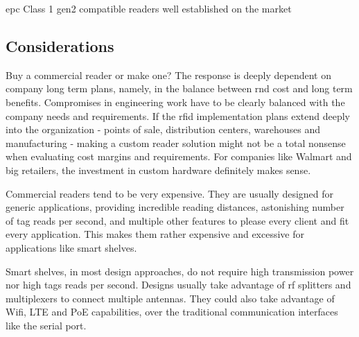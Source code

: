 \begin{table}
    \centering
    \caption{\ac{epc} Class 1 \ac{gen2} compatible readers well established on the market}
    \label{tab:readercommercialsolutions}
\end{table}

\subsection{Considerations}

Buy a commercial reader or make one?
The response is deeply dependent on company long term plans, namely, in the balance between \ac{rnd} cost and long term benefits. Compromises in engineering work have to be clearly balanced with the company needs and requirements. If the \ac{rfid} implementation plans extend deeply into the organization - points of sale, distribution centers, warehouses and manufacturing - making a custom reader solution might not be a total nonsense when evaluating cost margins and requirements. For companies like Walmart and big retailers, the investment in custom hardware definitely makes sense.

Commercial readers tend to be very expensive. They are usually designed for generic applications, providing incredible reading distances, astonishing number of tag reads per second, and multiple other features to please every client and fit every application.
This makes them rather expensive and excessive for applications like smart shelves.

Smart shelves, in most design approaches, do not require high transmission power nor high tags reads per second. Designs usually take advantage of \ac{rf} splitters and multiplexers to connect multiple antennas. They could also take advantage of Wifi, LTE and PoE capabilities, over the traditional communication interfaces like the serial port.

